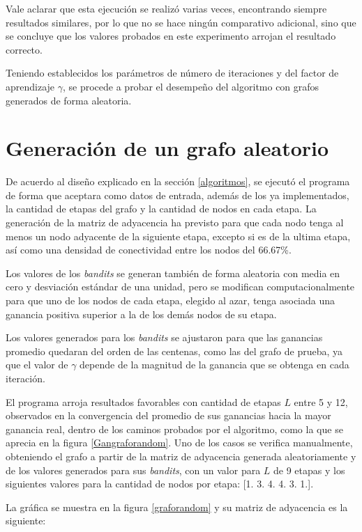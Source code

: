 Vale aclarar que esta ejecución se realizó varias veces, encontrando siempre resultados similares, por lo que no se hace ningún comparativo adicional, sino que  se concluye que los valores probados en este experimento arrojan el resultado correcto.

Teniendo establecidos los parámetros de número de iteraciones y del factor de aprendizaje $\gamma$, se procede a probar el desempeño del algoritmo con grafos generados de forma aleatoria.

\section{Generación de un grafo aleatorio}

De acuerdo al diseño explicado en la sección \ref{algoritmos}, se ejecutó el programa de forma que aceptara como datos de entrada, además de los ya implementados, la cantidad de etapas del grafo y la cantidad de nodos en cada etapa. La generación de la matriz de adyacencia ha previsto para que cada nodo tenga al menos un nodo adyacente de la siguiente etapa, excepto si es de la ultima etapa, así como una densidad de conectividad entre los nodos del 66.67\%. 

Los valores de los \textit{bandits} se generan también de forma aleatoria con media en cero y desviación estándar de una unidad, pero se modifican computacionalmente para que uno de los nodos de cada etapa, elegido al azar, tenga asociada una ganancia positiva superior a la de los demás nodos de su etapa. 

Los valores generados para los \textit{bandits} se ajustaron para que las ganancias promedio quedaran del orden de las centenas, como las del grafo de prueba, ya que el valor de $\gamma$ depende de la magnitud de la ganancia que se obtenga en cada iteración.

El programa arroja resultados favorables con cantidad de etapas $L$ entre 5 y 12, observados en la convergencia del promedio de sus ganancias hacia la mayor ganancia real, dentro de los caminos probados por el algoritmo, como la que se aprecia en la figura \ref{Gangraforandom}. Uno de los casos se verifica manualmente, obteniendo el grafo a partir de la matriz de adyacencia generada aleatoriamente y de los valores generados para sus \textit{bandits}, con un valor para $L$ de 9 etapas y los siguientes valores para la cantidad de nodos por etapa: [1. 3. 4. 4. 3. 1.].

La gráfica se muestra en la figura \ref{graforandom} y su matriz de adyacencia es la siguiente:


